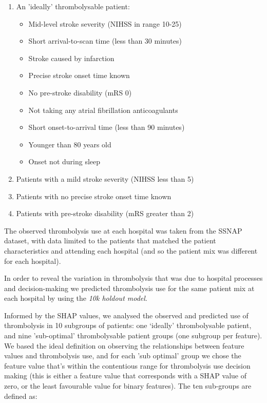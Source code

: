 \begin{enumerate}
  \item An 'ideally' thrombolysable patient:
  \begin{itemize}
    \item Mid-level stroke severity (NIHSS in range 10-25)
    \item Short arrival-to-scan time (less than 30 minutes)
    \item Stroke caused by infarction
    \item Precise stroke onset time known
    \item No pre-stroke disability (mRS 0)
    \item Not taking any atrial fibrillation anticoagulants
    \item Short onset-to-arrival time (less than 90 minutes)
    \item Younger than 80 years old
    \item Onset not during sleep
  \end{itemize}
  \item Patients with a mild stroke severity (NIHSS less than 5)
  \item Patients with no precise stroke onset time known
  \item Patients with pre-stroke disability (mRS greater than 2)
\end{enumerate}

The observed thrombolysis use at each hospital was taken from the SSNAP dataset, with data limited to the patients that matched the patient characteristics and attending each hospital (and so the patient mix was different for each hospital).

In order to reveal the variation in thrombolysis that was due to hospital processes and decision-making we predicted thrombolysis use for the same patient mix at each hospital by using the \emph{10k holdout model}.
\fi

Informed by the SHAP values, we analysed the observed and predicted use of thrombolysis in 10 subgroups of patients: one `ideally' thrombolysable patient, and nine 'sub-optimal' thrombolysable patient groups (one subgroup per feature). We based the ideal definition on observing the relationships between feature values and thrombolysis use, and for each 'sub optimal' group we chose the feature value that's within the contentious range for thrombolysis use decision making (this is either a feature value that corresponds with a SHAP value of zero, or the least favourable value for binary features). The ten sub-groups are defined as:

